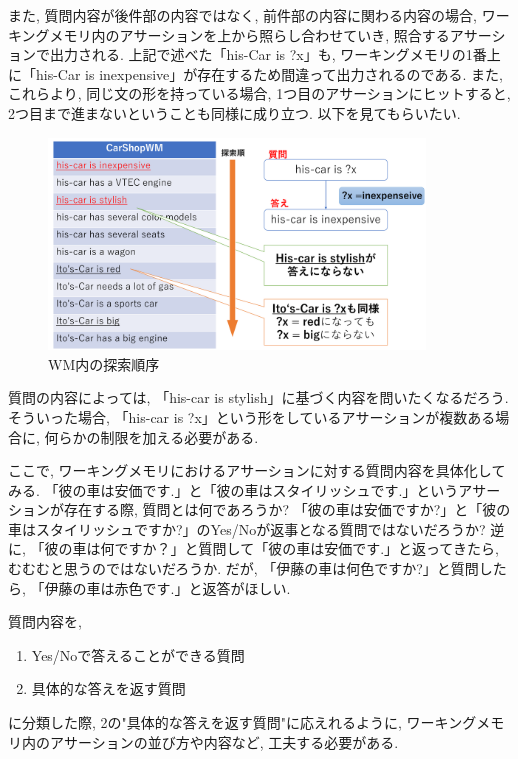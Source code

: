 \documentclass[uplatex,12pt]{jsarticle}
\begin{document}
また, 質問内容が後件部の内容ではなく, 前件部の内容に関わる内容の場合, ワーキングメモリ内のアサーションを上から照らし合わせていき, 照合するアサーションで出力される. 上記で述べた「his-Car is ?x」も, ワーキングメモリの1番上に「his-Car is inexpensive」が存在するため間違って出力されるのである. また, これらより, 同じ文の形を持っている場合, 1つ目のアサーションにヒットすると, 2つ目まで進まないということも同様に成り立つ. 以下を見てもらいたい.

\begin{figure}[htbp]
 \begin{center}
  \includegraphics[width = 10cm, pagebox = cropbox, clip]{images/後ろ向き推論_WMの探索.pdf}
 \end{center}
 \caption[]{WM内の探索順序}\label{fig:fig1.1}
\end{figure}

質問の内容によっては, 「his-car is stylish」に基づく内容を問いたくなるだろう. そういった場合, 「his-car is ?x」という形をしているアサーションが複数ある場合に, 何らかの制限を加える必要がある.

ここで, ワーキングメモリにおけるアサーションに対する質問内容を具体化してみる. 「彼の車は安価です.」と「彼の車はスタイリッシュです.」というアサーションが存在する際, 質問とは何であろうか? 「彼の車は安価ですか?」と「彼の車はスタイリッシュですか?」のYes/Noが返事となる質問ではないだろうか? 逆に, 「彼の車は何ですか？」と質問して「彼の車は安価です.」と返ってきたら, むむむと思うのではないだろうか. だが, 「伊藤の車は何色ですか?」と質問したら, 「伊藤の車は赤色です.」と返答がほしい. 

質問内容を, 
\begin{enumerate}
\item Yes/Noで答えることができる質問
\item 具体的な答えを返す質問
\end{enumerate}
に分類した際, 2の"具体的な答えを返す質問"に応えれるように, ワーキングメモリ内のアサーションの並び方や内容など, 工夫する必要がある.
\end{document}
